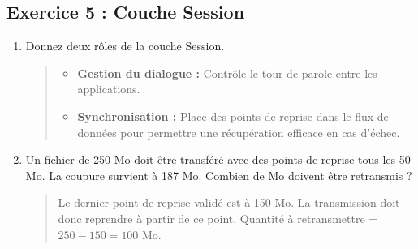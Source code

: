 \documentclass[a4paper,12pt]{article}
\begin{document}
\subsection*{Exercice 5 : Couche Session}
\begin{enumerate}
    \item Donnez deux rôles de la couche Session.
    \begin{quote}
        \begin{itemize}
            \item \textbf{Gestion du dialogue :} Contrôle le tour de parole entre les applications.
            \item \textbf{Synchronisation :} Place des points de reprise dans le flux de données pour permettre une récupération efficace en cas d'échec.
        \end{itemize}
    \end{quote}
    \item Un fichier de 250 Mo doit être transféré avec des points de reprise tous les 50 Mo. La coupure survient à 187 Mo. Combien de Mo doivent être retransmis ?
    \begin{quote}
        Le dernier point de reprise validé est à 150 Mo. La transmission doit donc reprendre à partir de ce point.
        Quantité à retransmettre = $250 - 150 = 100$ Mo.
    \end{quote}
\end{enumerate}
\end{document}
